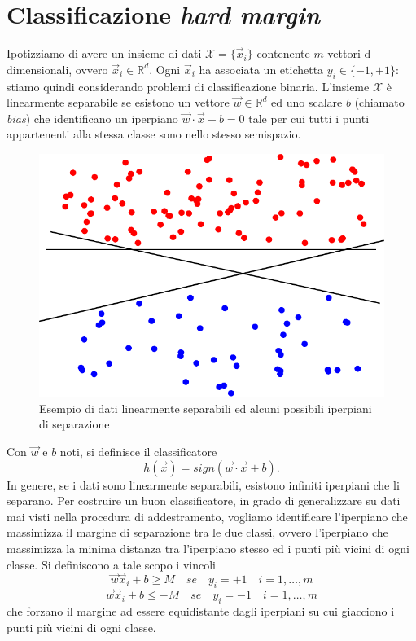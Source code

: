 \section{Classificazione \emph{hard margin}}\label{sec:hard_margin_classifier}
Ipotizziamo di avere un insieme di dati $\mathcal{X} = \{\Vec{x}_i\}$ contenente $m$ vettori d-dimensionali, ovvero $\Vec{x}_i \in \mathbb{R}^d$. 
Ogni $\Vec{x}_i$ ha associata un etichetta $y_i \in \{-1, +1\}$: stiamo quindi considerando problemi di classificazione binaria.
%
L'insieme $\mathcal{X}$ è linearmente separabile se esistono un vettore $\Vec{w} \in \mathbb{R}^d$ ed uno scalare $b$ (chiamato \emph{bias}) che identificano un iperpiano $\Vec{w}\cdot \Vec{x} +b=0$ tale per cui tutti i punti appartenenti alla stessa classe sono nello stesso semispazio.
\begin{figure}
    \centering
    \includegraphics[width=0.5\linewidth]{img/dati_linearmente_separabili.pdf}
    \caption{Esempio di dati linearmente separabili ed alcuni possibili iperpiani di separazione}
    \label{fig:dati_linearmente_separabili}
\end{figure}
Con $\Vec{w}$ e $b$ noti, si definisce il classificatore \[ h(\Vec{x}) = sign(\Vec{w}\cdot \Vec{x} +b). \]
In genere, se i dati sono linearmente separabili, esistono infiniti iperpiani che li separano. Per costruire un buon classificatore, in grado di generalizzare su dati mai visti nella procedura di addestramento, vogliamo identificare l'iperpiano che massimizza il margine di separazione tra le due classi, ovvero l'iperpiano che massimizza la minima distanza tra l'iperpiano stesso ed i punti più vicini di ogni classe. Si definiscono a tale scopo i vincoli 
\begin{equation*}
    \Vec{w}\Vec{x}_i + b \geq M \quad se \quad y_i = +1 \quad  i=1,\dots,m
\end{equation*}
\begin{equation*}
    \Vec{w}\Vec{x}_i + b \leq -M \quad se \quad y_i = -1 \quad i=1,\dots,m
\end{equation*}
che forzano il margine ad essere equidistante dagli iperpiani su cui giacciono i punti più vicini di ogni classe.
